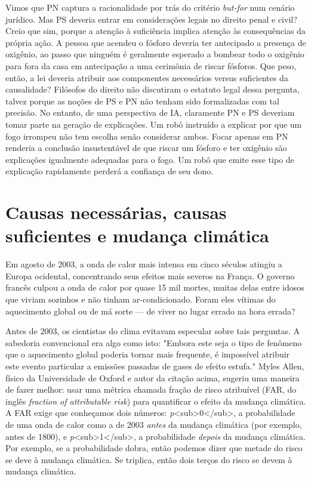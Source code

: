 \documentclass[11pt,a5paper,twoside]{book}
\begin{document}
Vimos que PN captura a racionalidade por trás do critério \textit{but-for} num cenário jurídico. Mas PS deveria entrar em considerações legais no direito penal e civil? Creio que sim, porque a atenção à suficiência implica atenção às consequências da própria ação. A pessoa que acendeu o fósforo deveria ter antecipado a presença de oxigênio, ao passo que ninguém é geralmente esperado a bombear todo o oxigênio para fora da casa em antecipação a uma cerimônia de riscar fósforos. Que peso, então, a lei deveria atribuir aos componentes necessários versus suficientes da causalidade? Filósofos do direito não discutiram o estatuto legal dessa pergunta, talvez porque as noções de PS e PN não tenham sido formalizadas com tal precisão. No entanto, de uma perspectiva de IA, claramente PN e PS deveriam tomar parte na geração de explicações. Um robô instruído a explicar por que um fogo irrompeu não tem escolha senão considerar ambos. Focar apenas em PN renderia a conclusão insustentável de que riscar um fósforo e ter oxigênio são explicações igualmente adequadas para o fogo. Um robô que emite esse tipo de explicação rapidamente perderá a confiança de seu dono.

\section{Causas necessárias, causas suficientes e mudança climática}
Em agosto de 2003, a onda de calor mais intensa em cinco séculos atingiu a Europa ocidental, concentrando seus efeitos mais severos na França. O governo francês culpou a onda de calor por quase 15 mil mortes, muitas delas entre idosos que viviam sozinhos e não tinham ar-condicionado. Foram eles vítimas do aquecimento global ou de má sorte — de viver no lugar errado na hora errada?

Antes de 2003, os cientistas do clima evitavam especular sobre tais perguntas. A sabedoria convencional era algo como isto: "Embora este seja o tipo de fenômeno que o aquecimento global poderia tornar mais frequente, é impossível atribuir este evento particular a emissões passadas de gases de efeito estufa." Myles Allen, físico da Universidade de Oxford e autor da citação acima, sugeriu uma maneira de fazer melhor: usar uma métrica chamada fração de risco atribuível (FAR, do inglês \textit{fraction of attributable risk}) para quantificar o efeito da mudança climática. A FAR exige que conheçamos dois números: \textit{p}<sub>0</sub>, a probabilidade de uma onda de calor como a de 2003 \textit{antes} da mudança climática (por exemplo, antes de 1800), e \textit{p}<sub>1</sub>, a probabilidade \textit{depois} da mudança climática. Por exemplo, se a probabilidade dobra, então podemos dizer que metade do risco se deve à mudança climática. Se triplica, então dois terços do risco se devem à mudança climática.
\end{document}
